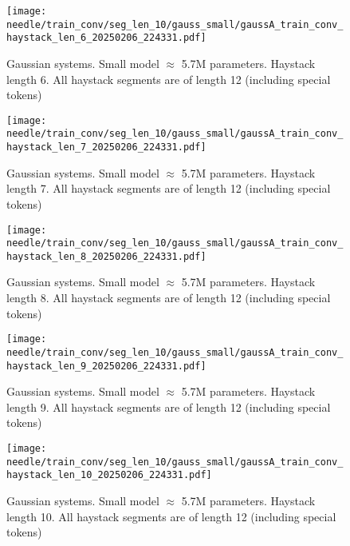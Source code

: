 \begin{figure}[h]
    \centering
    \texttt{[image: needle/train\_conv/seg\_len\_10/gauss\_small/gaussA\_train\_conv\_haystack\_len\_6\_20250206\_224331.pdf]}
    \caption{Gaussian systems. Small model $\approx$ 5.7M parameters. Haystack length 6. All haystack segments are of length 12 (including special tokens)}
    \label{fig:gauss_small_needle_train_conv_haystack_len_6_all_haystack_len_12}

\end{figure}

\begin{figure}[h]
    \centering
    \texttt{[image: needle/train\_conv/seg\_len\_10/gauss\_small/gaussA\_train\_conv\_haystack\_len\_7\_20250206\_224331.pdf]}
    \caption{Gaussian systems. Small model $\approx$ 5.7M parameters. Haystack length 7. All haystack segments are of length 12 (including special tokens)}
    \label{fig:gauss_small_needle_train_conv_haystack_len_7_all_haystack_len_12}

\end{figure}

\begin{figure}[h]
    \centering
    \texttt{[image: needle/train\_conv/seg\_len\_10/gauss\_small/gaussA\_train\_conv\_haystack\_len\_8\_20250206\_224331.pdf]}
    \caption{Gaussian systems. Small model $\approx$ 5.7M parameters. Haystack length 8. All haystack segments are of length 12 (including special tokens)}
    \label{fig:gauss_small_needle_train_conv_haystack_len_8_all_haystack_len_12}

\end{figure}

\begin{figure}[h]
    \centering
    \texttt{[image: needle/train\_conv/seg\_len\_10/gauss\_small/gaussA\_train\_conv\_haystack\_len\_9\_20250206\_224331.pdf]}
    \caption{Gaussian systems. Small model $\approx$ 5.7M parameters. Haystack length 9. All haystack segments are of length 12 (including special tokens)}
    \label{fig:gauss_small_needle_train_conv_haystack_len_9_all_haystack_len_12}

\end{figure}

\begin{figure}[h]
    \centering
    \texttt{[image: needle/train\_conv/seg\_len\_10/gauss\_small/gaussA\_train\_conv\_haystack\_len\_10\_20250206\_224331.pdf]}
    \caption{Gaussian systems. Small model $\approx$ 5.7M parameters. Haystack length 10. All haystack segments are of length 12 (including special tokens)}
    \label{fig:gauss_small_needle_train_conv_haystack_len_10_all_haystack_len_12}

\end{figure}

